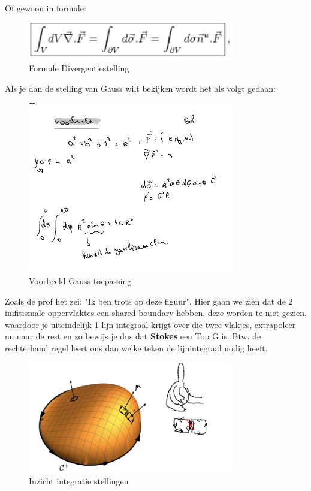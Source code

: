 \documentclass[a4paper]{report}
\begin{document}
Of gewoon in formule:

\begin{figure}[H]
	\centering
	\includegraphics[width=0.8\textwidth]{assets/formule_divergentie_wet.png}
	\caption{Formule Divergentiestelling}
	\label{fig:formule_divergentie_wet}
\end{figure}

Als je dan de stelling van Gauss wilt bekijken wordt het als volgt gedaan:

\begin{figure}[H]
	\centering
	\includegraphics[width=0.8\textwidth]{assets/voorbeeld_gauss_toepassing.png}
	\caption{Voorbeeld Gauss toepassing}
	\label{fig:voorbeeld_gauss_toepassing}
\end{figure}

Zoals de prof het zei: "Ik ben trots op deze figuur". Hier gaan we zien dat de 2 inifitismale oppervlaktes een shared boundary hebben, deze worden te niet gezien, waardoor je uiteindelijk 1 lijn integraal krijgt over die twee vlakjes, extrapoleer nu naar de rest en zo bewijs je dus dat \textbf{Stokes} een Top G is.
Btw, de rechterhand regel leert ons dan welke teken de lijnintegraal nodig heeft.

\begin{figure}[H]
	\centering
	\includegraphics[width=0.8\textwidth]{assets/inzicht_integraalstellingen.png}
	\caption{Inzicht integratie stellingen}
	\label{fig:inzicht_integraalstellingen}
\end{figure}
\end{document}
